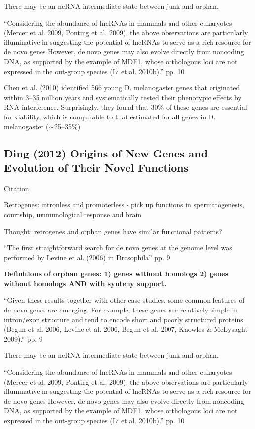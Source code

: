     There may be an ncRNA intermediate state between junk and orphan.

    ``Considering the abundance of lncRNAs in mammals and other eukaryotes
    (Mercer et al. 2009, Ponting et al. 2009), the above observations are
    particularly illuminative in suggesting the potential of lncRNAs to
    serve as a rich resource for de novo genes However, de novo genes may
    also evolve directly from noncoding DNA, as supported by the example of
    MDF1, whose orthologous loci are not expressed in the out-group species
    (Li et al. 2010b).'' pp. 10


    Chen et al. (2010) identified 566 young D. melanogaster genes that
    originated within 3–35 million years and systematically tested their
    phenotypic effects by RNA interference. Surprisingly, they found that
    30\% of these genes are essential for viability, which is comparable to
    that estimated for all genes in D. melanogaster (∼25–35\%)

\subsection{Ding (2012) Origins of New Genes and Evolution of Their Novel
Functions}

    Citation \cite{ding_origins_2012}
    
    Retrogenes: intronless and promoterless - pick up functions in
    spermatogenesis, courtship, ummunological response and brain

    Thought: retrogenes and orphan genes have similar functional patterns?

    ``The first straightforward search for de novo genes at the genome
    level was performed by Levine et al. (2006) in Drosophila'' pp. 9

    \textbf{Definitions of orphan genes: 1) genes without homologs 2) genes
    without homologs AND with synteny support.}

    ``Given these results together with other case studies, some common
    features of de novo genes are emerging. For example, these genes are
    relatively simple in intron/exon structure and tend to encode short and
    poorly structured proteins (Begun et al. 2006, Levine et al. 2006,
    Begun et al. 2007, Knowles \& McLysaght 2009).'' pp. 9

    There may be an ncRNA intermediate state between junk and orphan.

    ``Considering the abundance of lncRNAs in mammals and other eukaryotes
    (Mercer et al. 2009, Ponting et al. 2009), the above observations are
    particularly illuminative in suggesting the potential of lncRNAs to
    serve as a rich resource for de novo genes However, de novo genes may
    also evolve directly from noncoding DNA, as supported by the example of
    MDF1, whose orthologous loci are not expressed in the out-group species
    (Li et al. 2010b).'' pp. 10


